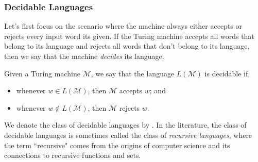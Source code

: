 \subsubsection*{Decidable Languages}

Let's first focus on the scenario where the machine always either accepts or rejects every input word its given. If the Turing machine accepts all words that belong to its language and rejects all words that don't belong to its language, then we say that the machine \emph{decides} its language.

\begin{definition}\label{def:decidablelanguage}
Given a Turing machine $\mathcal{M}$, we say that the language $L(\mathcal{M})$ is decidable if,
\begin{itemize}
\item whenever $w \in L(\mathcal{M})$, then $\mathcal{M}$ accepts $w$; and
\item whenever $w \not\in L(\mathcal{M})$, then $\mathcal{M}$ rejects $w$.
\end{itemize}
\end{definition}

We denote the class of decidable languages by \D. In the literature, the class of decidable languages is sometimes called the class of \emph{recursive languages}, where the term ``recursive" comes from the origins of computer science and its connections to recursive functions and sets.

